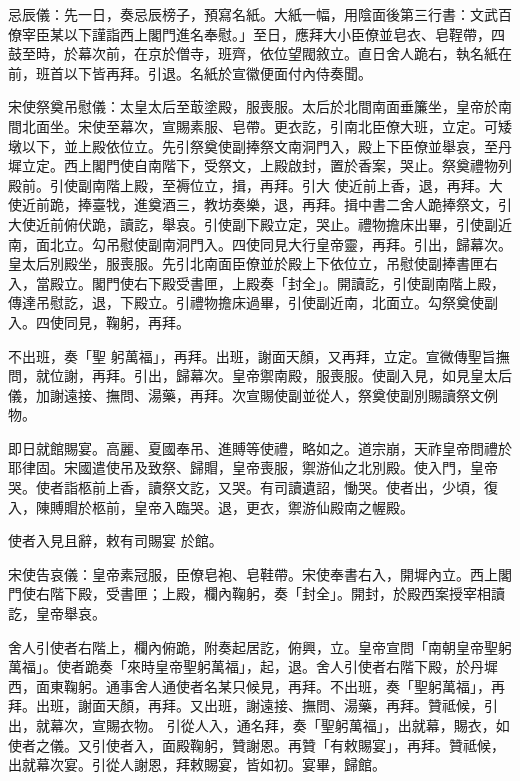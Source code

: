 \begin{pinyinscope}
 忌辰儀：先一日，奏忌辰榜子，預寫名紙。大紙一幅，用陰面後第三行書：文武百僚宰臣某以下謹詣西上閣門進名奉慰。」至日，應拜大小臣僚並皂衣、皂鞓帶，四
 鼓至時，於幕次前，在京於僧寺，班齊，依位望閥敘立。直日舍人跪右，執名紙在前，班首以下皆再拜。引退。名紙於宣徽便面付內侍奏聞。



 宋使祭奠吊慰儀：太皇太后至菆塗殿，服喪服。太后於北間南面垂簾坐，皇帝於南間北面坐。宋使至幕次，宣賜素服、皂帶。更衣訖，引南北臣僚大班，立定。可矮墩以下，並上殿依位立。先引祭奠使副捧祭文南洞門入，殿上下臣僚並舉哀，至丹墀立定。西上閣門使自南階下，受祭文，上殿啟封，置於香案，哭止。祭奠禮物列殿前。引使副南階上殿，至褥位立，揖，再拜。引大
 使近前上香，退，再拜。大使近前跪，捧臺牫，進奠酒三，教坊奏樂，退，再拜。揖中書二舍人跪捧祭文，引大使近前俯伏跪，讀訖，舉哀。引使副下殿立定，哭止。禮物擔床出畢，引使副近南，面北立。勾吊慰使副南洞門入。四使同見大行皇帝靈，再拜。引出，歸幕次。皇太后別殿坐，服喪服。先引北南面臣僚並於殿上下依位立，吊慰使副捧書匣右入，當殿立。閣門使右下殿受書匣，上殿奏「封全」。開讀訖，引使副南階上殿，傳達吊慰訖，退，下殿立。引禮物擔床過畢，引使副近南，北面立。勾祭奠使副入。四使同見，鞠躬，再拜。



 不出班，奏「聖
 躬萬福」，再拜。出班，謝面天顏，又再拜，立定。宣微傳聖旨撫問，就位謝，再拜。引出，歸幕次。皇帝禦南殿，服喪服。使副入見，如見皇太后儀，加謝遠接、撫問、湯藥，再拜。次宣賜使副並從人，祭奠使副別賜讀祭文例物。



 即日就館賜宴。高麗、夏國奉吊、進賻等使禮，略如之。道宗崩，天祚皇帝問禮於耶律固。宋國遣使吊及致祭、歸賵，皇帝喪服，禦游仙之北別殿。使入門，皇帝哭。使者詣柩前上香，讀祭文訖，又哭。有司讀遺詔，慟哭。使者出，少頃，復入，陳賻賵於柩前，皇帝入臨哭。退，更衣，禦游仙殿南之幄殿。



 使者入見且辭，敕有司賜宴
 於館。



 宋使告哀儀：皇帝素冠服，臣僚皂袍、皂鞋帶。宋使奉書右入，開墀內立。西上閣門使右階下殿，受書匣；上殿，欄內鞠躬，奏「封全」。開封，於殿西案授宰相讀訖，皇帝舉哀。



 舍人引使者右階上，欄內俯跪，附奏起居訖，俯興，立。皇帝宣問「南朝皇帝聖躬萬福」。使者跪奏「來時皇帝聖躬萬福」，起，退。舍人引使者右階下殿，於丹墀西，面東鞠躬。通事舍人通使者名某只候見，再拜。不出班，奏「聖躬萬福」，再拜。出班，謝面天顏，再拜。又出班，謝遠接、撫問、湯藥，再拜。贊祗候，引出，就幕次，宣賜衣物。
 引從人入，通名拜，奏「聖躬萬福」，出就幕，賜衣，如使者之儀。又引使者入，面殿鞠躬，贊謝恩。再贊「有敕賜宴」，再拜。贊祗候，出就幕次宴。引從人謝恩，拜敕賜宴，皆如初。宴畢，歸館。




\end{pinyinscope}
